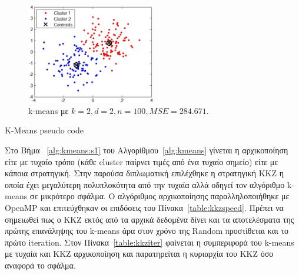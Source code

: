 \begin{figure}[ht]
  \centering
  \includegraphics[width=0.5\textwidth]{chapter3/kmeans.jpg}
  \caption{k-means με $k=2,d=2,n=100,MSE=284.671$. \cite{misc:kmeans}}
  \label{fig:kmeans}
\end{figure}

\begin{algorithm}[H]
\begin{algorithmic}[1]
 \label{alg:kmeans:s1}
     \label{alg:kmeans:s4}
         \label{alg:kmeans:s5}
    \EndFor
    \EndFor
\EndWhile
\end{algorithmic}
\caption{K-Means pseudo code}
\label{alg:kmeans}
\end{algorithm}

\newpage

\indent Στο Βήμα ~\ref{alg:kmeans:s1} του Αλγορίθμου~\ref{alg:kmeans} γίνεται η αρχικοποίηση είτε με τυχαίο τρόπο
(κάθε cluster παίρνει τιμές από ένα τυχαίο σημείο) είτε με κάποια στρατηγική. Στην παρούσα διπλωματική επιλέχθηκε
η στρατηγική KKZ \cite{kkz} η οποία έχει μεγαλύτερη πολυπλοκότητα από την τυχαία αλλά οδηγεί τον αλγόριθμο k-means
σε μικρότερο σφάλμα. Ο αλγόριθμος αρχικοποίησης παραλληλοποιήθηκε με OpenMP και επιτεύχθηκαν οι επιδόσεις του Πίνακα~\ref{table:kkzspeed}.
Πρέπει να σημειωθεί πως ο KKZ εκτός από τα αρχικά δεδομένα δίνει και τα αποτελέσματα της πρώτης επανάληψης του k-means άρα στον χρόνο της Random προστίθεται και το πρώτο iteration.
Στον Πίνακα~\ref{table:kkziter} φαίνεται η συμπεριφορά του k-means με τυχαία και KKZ αρχικοποίηση και παρατηρείται η κυριαρχία
του KKZ όσο αναφορά το σφάλμα.

